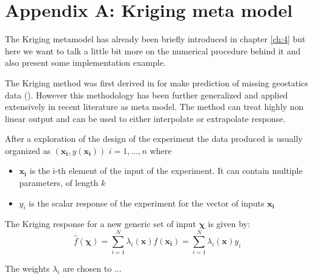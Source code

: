 \chapter*{Appendix A: Kriging meta model}

The Kriging metamodel has already been briefly introduced in chapter \ref{ch:4} but here we want to talk a little bit more on the numerical procedure behind it and also present some implementation example.

The Kriging method was first derived in for make prediction of missing geostatics data (\citet{krige1951statistical}). However this methodology has been further generalized and applied extensively in recent literature as meta model.
The method can treat highly non linear output and can be used to either interpolate or extrapolate response.

After a exploration of the design of the experiment the data produced is usually organized as $(\mathbf{x_i}, y(\mathbf{x_i}))$  $i=1,...,n$ where
\begin{itemize}
	\item $\mathbf{x_i}$ is the i-th element of the input of the experiment. It can contain multiple parameters, of length $k$
	\item $y_i$ is the scalar response of the experiment for the vector of inputs $\mathbf{x_i}$
\end{itemize}

The Kriging response for a new generic set of input $\boldsymbol{\chi}$ is given by:
\begin{equation}
	\hat{f}(\boldsymbol{\chi}) = \sum_{i=1}^{N} \lambda_i(\mathbf{x}) f(\mathbf{x_i}) =  \sum_{i=1}^{N} \lambda_i(\mathbf{x}) y_i
\end{equation}

The weights $\lambda_i$ are chosen to ...